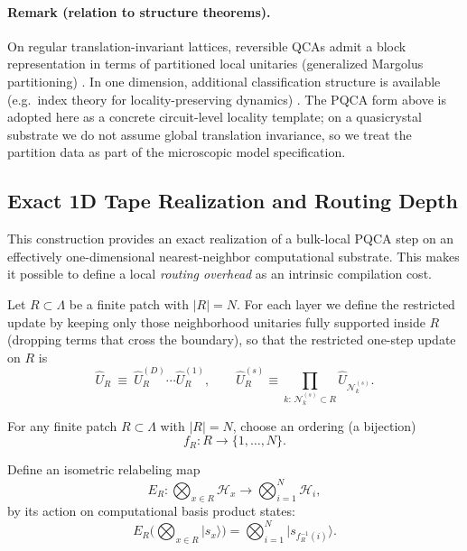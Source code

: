 \paragraph{Remark (relation to structure theorems).}
On regular translation-invariant lattices, reversible QCAs admit a block representation in terms of partitioned local unitaries (generalized Margolus partitioning) \cite{SchumacherWerner2004}. In one dimension, additional classification structure is available (e.g.\ index theory for locality-preserving dynamics) \cite{GrossNesmeVogtsWerner2012}. The PQCA form above is adopted here as a concrete circuit-level locality template; on a quasicrystal substrate we do not assume global translation invariance, so we treat the partition data as part of the microscopic model specification.

\subsection{Exact 1D Tape Realization and Routing Depth}
\label{sec:routeA_routing}
This construction provides an exact realization of a bulk-local PQCA step on an effectively one-dimensional nearest-neighbor computational substrate. This makes it possible to define a local \emph{routing overhead} as an intrinsic compilation cost.

Let $R \subset \Lambda$ be a finite patch with $|R|=N$. For each layer we define the restricted update by keeping only those neighborhood unitaries fully supported inside $R$ (dropping terms that cross the boundary), so that the restricted one-step update on $R$ is
\begin{equation}
    \hat U_R\ \equiv\ \hat U_R^{(D)}\cdots \hat U_R^{(1)},\qquad
    \hat U_R^{(s)}\equiv \prod_{k:\,\mathcal{N}_k^{(s)} \subset R} \hat U_{\mathcal{N}_k^{(s)}}.
\end{equation}

\begin{definition}
\label{def:tape_ordering}
For any finite patch $R \subset \Lambda$ with $|R|=N$, choose an ordering (a bijection)
\begin{equation}
    f_R: R \to \{1,\dots,N\}.
\end{equation}
\end{definition}

\begin{definition}
\label{def:tape_encoding_isometry}
Define an isometric relabeling map
\begin{equation}
    E_R:\bigotimes_{x\in R}\mathcal H_x\to\bigotimes_{i=1}^{N}\mathcal H_i,
\end{equation}
by its action on computational basis product states:
\begin{equation}
    E_R\!\Big(\bigotimes_{x\in R}|s_x\rangle\Big)=\bigotimes_{i=1}^{N}\big|s_{f_R^{-1}(i)}\big\rangle .
\end{equation}
\end{definition}

